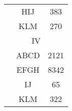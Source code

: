 \documentclass{jsarticle}
\begin{document}
\begin{CJK}{UTF8}{min}
\begin{table}[htbp]
\begin{minipage}[t]{0.48\textwidth}
\begin{tabular}{|c|c|c|}
 & \textsf{HIJ} & 383 \\
 & \textsf{KLM} & 270 \\
\hline
\multicolumn{3}{|c|}{IV} \\
\hline
 & \textsf{ABCD} & 2121 \\
 & \textsf{EFGH} & 8342 \\
 & \textsf{IJ} & 65 \\
 & \textsf{KLM} & 322 \\
\hline
\end{tabular}
\end{minipage}
\end{table}

\end{CJK}
\end{document}
